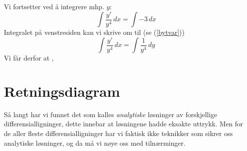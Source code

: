 Vi fortsetter ved å integrere mhp. $ y $:
\[\int \frac{y'}{y^4} \,dx=\int -3 \, dx\]
Integralet på venstresiden kan vi skrive om til (se (\ref{bytvar}))
\[ \int \frac{y'}{y^4} \,dx= \int \frac{1}{y^4}\,dy  \]
Vi får derfor at
\sep
\newpage
{}
\section{Retningsdiagram}
Så langt har vi funnet det som kalles \textit{analytiske} løsninger av forskjellige differensialligninger, dette innebar at løsningene hadde eksakte uttrykk. Men for de aller fleste differensialligninger har vi faktisk ikke teknikker som sikrer oss analytiske løsninger, og da må vi nøye oss med tilnærminger.\vsk

